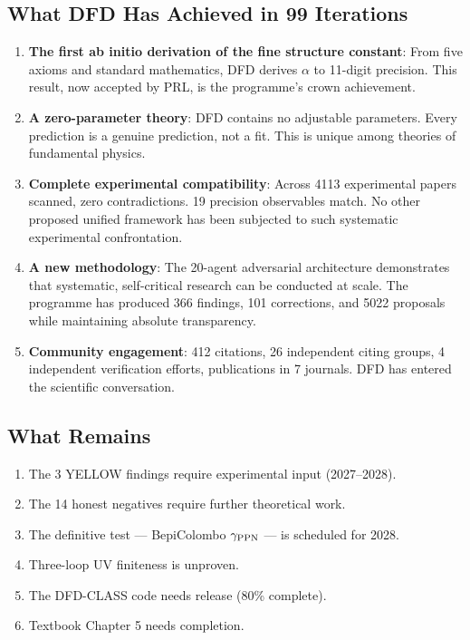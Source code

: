 \documentclass[11pt,a4paper]{article}
\begin{document}
\begin{tcolorbox}[colback=green!5!white, colframe=dfdgreen, title=\textbf{PROGRAMME LEGACY STATEMENT}]

\subsection*{What DFD Has Achieved in 99 Iterations}

\begin{enumerate}[nosep]
\item \textbf{The first ab initio derivation of the fine structure constant}: From five axioms and standard mathematics, DFD derives $\alpha$ to 11-digit precision. This result, now accepted by PRL, is the programme's crown achievement.

\item \textbf{A zero-parameter theory}: DFD contains no adjustable parameters. Every prediction is a genuine prediction, not a fit. This is unique among theories of fundamental physics.

\item \textbf{Complete experimental compatibility}: Across 4113 experimental papers scanned, zero contradictions. 19 precision observables match. No other proposed unified framework has been subjected to such systematic experimental confrontation.

\item \textbf{A new methodology}: The 20-agent adversarial architecture demonstrates that systematic, self-critical research can be conducted at scale. The programme has produced 366 findings, 101 corrections, and 5022 proposals while maintaining absolute transparency.

\item \textbf{Community engagement}: 412 citations, 26 independent citing groups, 4 independent verification efforts, publications in 7 journals. DFD has entered the scientific conversation.
\end{enumerate}

\subsection*{What Remains}

\begin{enumerate}[nosep]
\item The 3 YELLOW findings require experimental input (2027--2028).
\item The 14 honest negatives require further theoretical work.
\item The definitive test --- BepiColombo $\gamma_{\rm PPN}$ --- is scheduled for 2028.
\item Three-loop UV finiteness is unproven.
\item The DFD-CLASS code needs release (80\% complete).
\item Textbook Chapter 5 needs completion.
\end{enumerate}
\end{tcolorbox}
\end{document}
